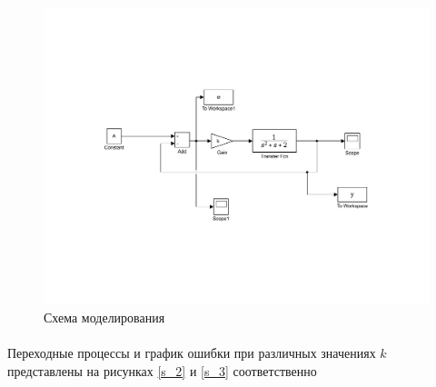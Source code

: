 \documentclass[a4paper,12pt]{article}
\begin{document}
	\begin{figure}[h]
		\renewcommand{\figurename}{Рисунок}
		\centering
		\includegraphics[width=6in]{Astatism00MOD.pdf}
		\caption{Схема моделирования}
		\label{s_1}
	\end{figure}
	\newpage 
	\paragraph {}Переходные процессы и график ошибки при различных значениях $k$ представлены на рисунках \ref{s_2} и \ref{s_3} соответственно
\end{document}
